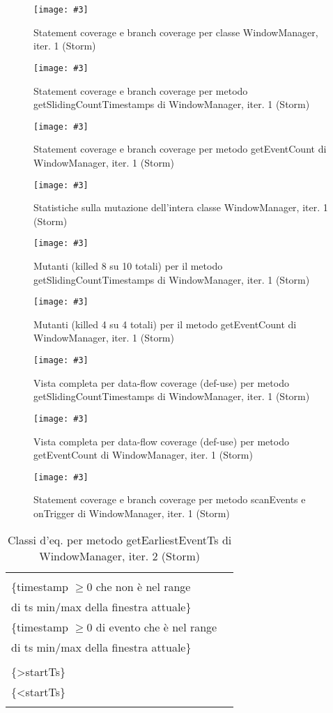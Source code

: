 \documentclass[10pt, a4paper]{article}
\newcommand{\Intmaketable}[4]{
	\begin{longtable}{#3}
	#4
	\caption{#2}
	\label{#1}
	\end{longtable}
}
\newcommand{\Intceqtable}[3]{
	\Intmaketable{#1}{#2}{|l|l|}{
	\hline
	\thead{Parametro formale} & \thead{Classi d'equivalenza} \\
	\hline
	\hline
	#3
	\hline}
}
\newcommand{\Intceqcaption}[4]{Classi d'eq. per metodo #1 di #2, iter. #3 (#4)}
\newcommand{\gettablelabel}[5]{table:#1:#2:#3:iter#4:proj#5}
\newcommand{\ceqtable}[5]{
	\Intceqtable{\gettablelabel{ceq}{#1}{#2}{#3}{#4}}
		{\Intceqcaption{#1}{#2}{#3}{#4}}
		{#5}
}
\newcommand{\getpicturelabel}[1]{picture:#1}
\newcommand{\makepicture}[4]{
	\begin{figure}[H]
	\centering
	\texttt{[image: \#3]}
	\caption{#4}
	\label{\getpicturelabel{#3}}
	\end{figure}
}
\newcommand{\alldfcovcaption}[4]{Vista completa per data-flow coverage (def-use) per metodo #1 di #2, iter. #3 (#4)}
\newcommand{\methodcfcovcaption}[4]{Statement coverage e branch coverage per metodo #1 di #2, iter. #3 (#4)}
\newcommand{\classcfcovcaption}[3]{Statement coverage e branch coverage per classe #1, iter. #2 (#3)}
\newcommand{\mutclasscaption}[3]{Statistiche sulla mutazione dell'intera classe #1, iter. #2 (#3)}
\newcommand{\mutmethodcaption}[6]{Mutanti (killed #5 su #6 totali) per il metodo #1 di #2, iter. #3 (#4)}
\newcommand{\tcell}{\makecell[tl]}
\newcommand{\newtrow}{\\ \hline}
\def\storm{Storm}
\newcommand{\ceq}[1]{\{#1\}}
\begin{document}
	\makepicture{17.5cm}{1.25cm}{storm/controlflow-WindowManager-1}
				{\classcfcovcaption{WindowManager}{1}{\storm}}
				
	\makepicture{17cm}{0.75cm}{storm/controlflow-getSlidingCountTimestamps-WindowManager-1}
				{\methodcfcovcaption{getSlidingCountTimestamps}{WindowManager}{1}{\storm}}
				
	\makepicture{17cm}{0.75cm}{storm/controlflow-getEventCount-WindowManager-1}
				{\methodcfcovcaption{getEventCount}{WindowManager}{1}{\storm}}
				
	\makepicture{17cm}{1.5cm}{storm/mutation-WindowManager-1}
				{\mutclasscaption{WindowManager}{1}{\storm}}
				
	\makepicture{17cm}{7cm}{storm/mutation-getSlidingCountTimestamps-WindowManager-1}
				{\mutmethodcaption{getSlidingCountTimestamps}{WindowManager}{1}{\storm}{8}{10}}
	
	\makepicture{11cm}{4cm}{storm/mutation-getEventCount-WindowManager-1}
				{\mutmethodcaption{getEventCount}{WindowManager}{1}{\storm}{4}{4}}
				
	\makepicture{13cm}{15cm}{storm/dataflow-getSlidingCountTimestamps-WindowManager-1}
				{\alldfcovcaption{getSlidingCountTimestamps}{WindowManager}{1}{\storm}}
				
	\makepicture{12cm}{6cm}{storm/dataflow-getEventCount-WindowManager-1}
				{\alldfcovcaption{getEventCount}{WindowManager}{1}{\storm}}
				
	\makepicture{17cm}{1.75cm}{storm/controlflow-missingmethods-WindowManager-1}
				{\methodcfcovcaption{scanEvents e onTrigger}{WindowManager}{1}{\storm}}
	
	
	\ceqtable{getEarliestEventTs}{WindowManager}{2}{\storm}{
			\tcell{startTs} &
			\tcell{
				\ceq{$< 0$}\\
				\ceq{timestamp $\ge 0$ che non è nel range\\ di ts min/max della finestra attuale}\\
				\ceq{timestamp $\ge 0$ di evento che è nel range\\ di ts min/max della finestra attuale}}
		\newtrow
			\tcell{endTs} &
			\tcell{\ceq{=startTs}\\\ceq{>startTs}\\\ceq{<startTs}}
		\newtrow
	}
	
\end{document}
